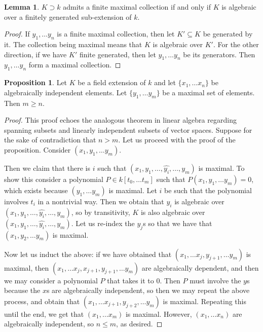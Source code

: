 \documentclass[12 pt]{article}
\theoremstyle{definition}
\newtheorem{lemma}[thm]{Lemma}
\newtheorem{propn}[thm]{Proposition}
\renewcommand{\(}{\left(}
\renewcommand{\)}{\right)}
\begin{document}
\begin{lemma}$K\supset k$ admits a finite maximal collection if and only if $K$ is algebraic over a finitely generated sub-extension of $k$.
\end{lemma}
\begin{proof}If $y_1, \ldots y_n$ is a finite maximal collection, then let $K' \subseteq K$ be generated by it. The collection being maximal means that $K$ is algebraic over $K'$. For the other direction, if we have $K'$ finite generated, then let $y_1, \ldots y_n$ be its generators. Then $y_1, \ldots y_n$ form a maximal collection.
\end{proof}


\begin{propn} Let $K$ be a field extension of $k$ and let $\{x_1, \ldots x_n\}$ be algebraically independent elements. Let $\{y_1, \ldots y_m\}$ be a maximal set of elements. Then $m \geq n$.
\end{propn}
\begin{proof}


This proof echoes the analogous theorem in linear algebra regarding spanning subsets and linearly independent subsets of vector spaces. Suppose for the sake of contradiction that $n>m$. Let us proceed with the proof of the proposition. Consider $(x_1, y_1, \ldots y_m)$.

Then we claim that there is $i$ such that $(x_1, y_1, \ldots , \widehat{y_i}, \ldots, y_m)$ is maximal. To show this consider a polynomial $P \in k[t_0, \ldots t_m]$ such that $P(x_1,y_1, \ldots y_m)=0$, which exists because $(y_1, \ldots y_m)$ is maximal. Let $i$ be such that the polynomial involves $t_i$ in a nontrivial way. Then we obtain that $y_i$ is algebraic over $(x_1, y_1, \ldots , \widehat{y_i}, \ldots, y_m)$, so by transitivity, $K$ is also algebraic over $(x_1, y_1, \ldots , \widehat{y_i}, \ldots, y_m)$. Let us re-index the $y_j$s so that we have that $(x_1, y_2, \ldots y_m)$ is maximal.

Now let us induct the above: if we have obtained that $(x_1, \ldots x_j, y_{j+1}, \ldots y_m)$ is maximal, then $(x_1, \ldots x_j,x_{j+1}, y_{j+1}, \ldots y_m)$ are algebraically dependent, and then we may consider a polynomial $P$ that takes it to 0. Then $P$ must involve the $y$s because the $x$s are algebraically independent, so then we may repeat the above process, and obtain that $(x_1, \ldots x_{j+1}, y_{j+2}, \ldots y_m)$ is maximal. Repeating this until the end, we get that $(x_1, \ldots x_m)$ is maximal. However, $(x_1, \ldots x_n)$ are algebraically independent, so $n \leq m$, as desired.
\end{proof}
\end{document}
